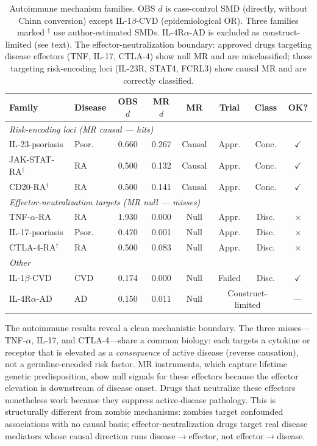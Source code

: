 \documentclass[11pt]{article}
\begin{document}
\begin{table}[t]
\centering
\caption{Autoimmune mechanism families. OBS $d$ is case-control SMD (directly, without Chinn conversion) except IL-1$\beta$-CVD (epidemiological OR). Three families marked $^\dagger$ use author-estimated SMDs. IL-4R$\alpha$-AD is excluded as construct-limited (see text). The effector-neutralization boundary: approved drugs targeting disease effectors (TNF, IL-17, CTLA-4) show null MR and are misclassified; those targeting risk-encoding loci (IL-23R, STAT4, FCRL3) show causal MR and are correctly classified.}
\label{tab:autoimmune}
\small
\begin{tabular}{llcccccc}
\toprule
Family & Disease & OBS $d$ & MR $d$ & MR & Trial & Class & OK? \\
\midrule
\multicolumn{8}{l}{\emph{Risk-encoding loci (MR causal --- hits)}} \\
IL-23-psoriasis & Psor. & 0.660 & 0.267 & Causal & Appr. & Conc. & $\checkmark$ \\
JAK-STAT-RA$^\dagger$ & RA & 0.500 & 0.132 & Causal & Appr. & Conc. & $\checkmark$ \\
CD20-RA$^\dagger$ & RA & 0.500 & 0.141 & Causal & Appr. & Conc. & $\checkmark$ \\
\midrule
\multicolumn{8}{l}{\emph{Effector-neutralization targets (MR null --- misses)}} \\
TNF-$\alpha$-RA & RA & 1.930 & 0.000 & Null & Appr. & Disc. & $\times$ \\
IL-17-psoriasis & Psor. & 0.470 & 0.001 & Null & Appr. & Disc. & $\times$ \\
CTLA-4-RA$^\dagger$ & RA & 0.500 & 0.083 & Null & Appr. & Disc. & $\times$ \\
\midrule
\multicolumn{8}{l}{\emph{Other}} \\
IL-1$\beta$-CVD & CVD & 0.174 & 0.000 & Null & Failed & Disc. & $\checkmark$ \\
IL-4R$\alpha$-AD & AD & 0.150 & 0.011 & Null & \multicolumn{2}{c}{Construct-limited} & --- \\
\bottomrule
\end{tabular}
\end{table}

The autoimmune results reveal a clean mechanistic boundary. The three misses---TNF-$\alpha$, IL-17, and CTLA-4---share a common biology: each targets a cytokine or receptor that is elevated as a \emph{consequence} of active disease (reverse causation), not a germline-encoded risk factor. MR instruments, which capture lifetime genetic predisposition, show null signals for these effectors because the effector elevation is downstream of disease onset. Drugs that neutralize these effectors nonetheless work because they suppress active-disease pathology. This is structurally different from zombie mechanisms: zombies target confounded associations with no causal basis; effector-neutralization drugs target real disease mediators whose causal direction runs disease$\to$effector, not effector$\to$disease.
\end{document}
